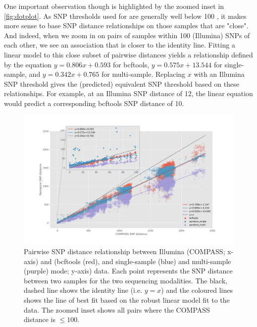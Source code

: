 One important observation though is highlighted by the zoomed inset in \autoref{fig:dotplot}. As SNP thresholds used for \mtb{} are generally well below 100 \cite{stimson2019}, it makes more sense to base SNP distance relationships on those samples that are "close". And indeed, when we zoom in on pairs of samples within 100 (Illumina) SNPs of each other, we see an association that is closer to the identity line. Fitting a linear model to this close subset of pairwise distances yields a relationship defined by the equation $y=0.806x+0.593$ for bcftools, $y=0.575x+13.544$ for \pandora{} single-sample, and $y=0.342x+0.765$ for \pandora{} multi-sample. Replacing $x$ with an Illumina SNP threshold gives the (predicted) equivalent \ont{} SNP threshold based on these relationships. For example, at an Illumina SNP distance of 12, the linear equation would predict a corresponding bcftools \ont{} SNP distance of 10.

\begin{figure}
\begin{center}
\includegraphics[width=0.90\columnwidth]{Chapter2/Figs/combined-dotplots.png}
\caption{{Pairwise SNP distance relationship between Illumina (COMPASS; x-axis) and \ont{} (bcftools (red), and \pandora{} single-sample (blue) and multi-sample (purple) mode; y-axis) data. Each point represents the SNP distance between two samples for the two sequencing modalities. The black, dashed line shows the identity line (i.e. $y=x$) and the coloured lines shows the line of best fit based on the robust linear model fit to the data. The zoomed inset shows all pairs where the COMPASS distance is $\le 100$.
{\label{fig:dotplot}}
}}
\end{center}
\end{figure}

